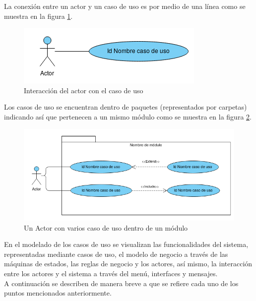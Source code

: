    La conexión entre un actor y un caso de uso es por medio de una línea como se muestra en la figura \ref{fig:acUC}.
   

    \begin{figure}[hbtp!]
        \begin{center}
            \includegraphics[width=.4\textwidth]{LIT/ActorUC}
        \end{center}
        \caption{Interacción del actor con el caso de uso}
        \label{fig:acUC}
    \end{figure}

    Los casos de uso se encuentran dentro de paquetes (representados por carpetas) indicando así que pertenecen a un mismo módulo 
    como se muestra en la figura \ref{fig:pack}.

    \begin{figure}[hbtp!]
        \begin{center}
            \includegraphics[width=.7\textwidth]{LIT/Paquete}
        \end{center}
        \caption{Un Actor con varios caso de uso dentro de un módulo}
        \label{fig:pack}
    \end{figure}

    En el modelado de los casos de uso se visualizan las funcionalidades del sistema, representadas mediante casos de uso, 
    el modelo de negocio a través de las máquinas de estados, las reglas de negocio y los actores, así mismo, la interacción entre 
    los actores y el sistema a través del menú, interfaces y  mensajes.\\

    A continuación se describen de manera breve a que se refiere cada uno de los puntos mencionados anteriormente.

